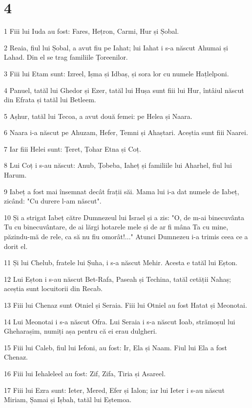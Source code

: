 \chapter{4}

\par 1 Fiii lui Iuda au fost: Fares, Hețron, Carmi, Hur și Șobal.
\par 2 Reaia, fiul lui Șobal, a avut fiu pe Iahat; lui Iahat i s-a născut Ahumai și Lahad. Din el se trag familiile Țoreenilor.
\par 3 Fiii lui Etam sunt: Izreel, Ișma și Idbaș, și sora lor cu numele Hațlelponi.
\par 4 Panuel, tatăl lui Ghedor și Ezer, tatăl lui Hușa sunt fiii lui Hur, întâiul născut din Efrata și tatăl lui Betleem.
\par 5 Așhur, tatăl lui Tecoa, a avut două femei: pe Helea și Naara.
\par 6 Naara i-a născut pe Ahuzam, Hefer, Temni și Ahaștari. Aceștia sunt fiii Naarei.
\par 7 Iar fiii Helei sunt: Țeret, Țohar Etna și Coț.
\par 8 Lui Coț i s-au născut: Anub, Țobeba, Iaheț și familiile lui Aharhel, fiul lui Harum.
\par 9 Iabeț a fost mai însemnat decât frații săi. Mama lui i-a dat numele de Iabeț, zicând: "Cu durere l-am născut".
\par 10 Și a strigat Iabeț către Dumnezeul lui Israel și a zis: "O, de m-ai binecuvânta Tu cu binecuvântare, de ai lărgi hotarele mele și de ar fi mâna Ta cu mine, păzindu-mă de rele, ca să nu fiu omorât!..." Atunci Dumnezeu i-a trimis ceea ce a dorit el.
\par 11 Și lui Chelub, fratele lui Șuha, i s-a născut Mehir. Acesta e tatăl lui Eșton.
\par 12 Lui Eșton i s-au născut Bet-Rafa, Paseah și Techina, tatăl cetății Nahaș; aceștia sunt locuitorii din Recab.
\par 13 Fiii lui Chenaz sunt Otniel și Seraia. Fiii lui Otniel au fost Hatat și Meonotai.
\par 14 Lui Meonotai i s-a născut Ofra. Lui Seraia i s-a născut Ioab, strămoșul lui Gheharașim, numiți așa pentru că ei erau dulgheri.
\par 15 Fiii lui Caleb, fiul lui Iefoni, au fost: Ir, Ela și Naam. Fiul lui Ela a fost Chenaz.
\par 16 Fiii lui Iehaleleel au fost: Zif, Zifa, Tiria și Asareel.
\par 17 Fiii lui Ezra sunt: Ieter, Mered, Efer și Ialon; iar lui Ieter i s-au născut Miriam, Șamai și Ișbah, tatăl lui Eștemoa.
